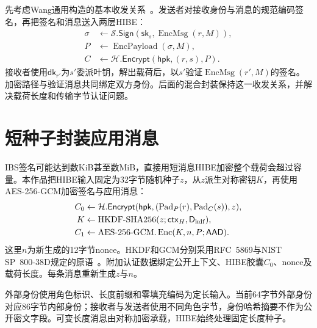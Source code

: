 先考虑Wang通用构造的基本收发关系~\cite{wang2024ibme}。发送者对接收身份与消息的规范编码签名，再把签名和消息送入两层HIBE：
\begin{align*}
 \sigma&\leftarrow\mathcal S.\mathsf{Sign}
       (\mathsf{sk}_s,\operatorname{EncMsg}(r,M)),\\
 P&\leftarrow\operatorname{EncPayload}(\sigma,M),\\
 C&\leftarrow\mathcal H.\mathsf{Encrypt}(\mathsf{hpk},(r,s),P).
\end{align*}
接收者使用$\mathsf{dk}_{r'}$为$s'$委派叶钥，解出载荷后，以$s'$验证$\operatorname{EncMsg}(r',M)$的签名。加密路径与验证消息共同绑定双方身份。后面的混合封装保持这一收发关系，并解决载荷长度和传输字节认证问题。

\section{短种子封装应用消息}
IBS签名可能达到数KiB甚至数MiB，直接用短消息HIBE加密整个载荷会超过容量。本作品把HIBE输入固定为32字节随机种子$z$，从$z$派生对称密钥$K$，再使用AES-256-GCM加密签名与应用消息：
\begin{align*}
 C_0&\leftarrow\mathcal H.\mathsf{Encrypt}
       (\mathsf{hpk},(\operatorname{Pad}_P(r),\operatorname{Pad}_C(s)),z),\\
 K&\leftarrow\operatorname{HKDF\text{-}SHA256}(z;\mathsf{ctx}_H,\mathsf D_{\rm kdf}),\\
 C_1&\leftarrow\operatorname{AES\text{-}256\text{-}GCM.Enc}(K,n,P;\mathsf{AAD}).
\end{align*}
这里$n$为新生成的12字节nonce。HKDF和GCM分别采用RFC~5869与NIST SP~800-38D规定的原语~\cite{rfc5869,nist2007gcm}。附加认证数据绑定公开上下文、HIBE胶囊$C_0$、nonce及载荷长度。每条消息重新生成$z$与$n$。

外部身份使用角色标识、长度前缀和零填充编码为定长输入。当前64字节外部身份对应86字节内部身份；接收者与发送者使用不同角色字节，身份哈希摘要不作为公开密文字段。可变长度消息由对称加密承载，HIBE始终处理固定长度种子。

